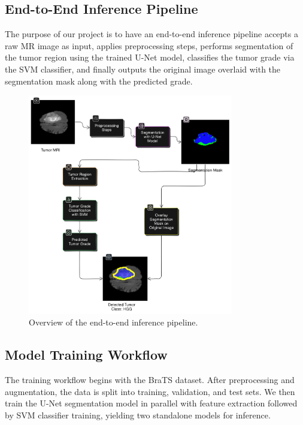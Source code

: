 \subsection{End-to-End Inference Pipeline}
The purpose of our project is to have an end-to-end inference pipeline accepts a raw MR image as input, applies preprocessing steps, performs segmentation of the tumor region using the trained U-Net model, classifies the tumor grade via the SVM classifier, and finally outputs the original image overlaid with the segmentation mask along with the predicted grade.
\begin{figure}[H]
  \centering
  \includegraphics[width=0.8\textwidth]{Images/Chapter3/pipeline.png}
  \caption{Overview of the end-to-end inference pipeline.}
  \label{fig:pipeline}
\end{figure}


\subsection{Model Training Workflow}
The training workflow begins with the BraTS dataset. After preprocessing and augmentation, the data is split into training, validation, and test sets. We then train the U-Net segmentation model in parallel with feature extraction followed by SVM classifier training, yielding two standalone models for inference.

